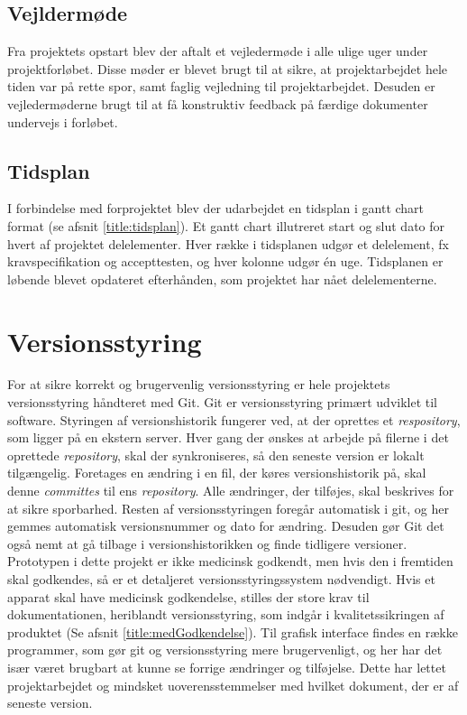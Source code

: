 \subsection{Vejldermøde}
Fra projektets opstart blev der aftalt et vejledermøde i alle ulige uger under projektforløbet. Disse møder er blevet brugt til at sikre, at projektarbejdet hele tiden var på rette spor, samt faglig vejledning til projektarbejdet. Desuden er vejledermøderne brugt til at få konstruktiv feedback på færdige dokumenter undervejs i forløbet. 

\subsection{Tidsplan}
I forbindelse med forprojektet blev der udarbejdet en tidsplan i gantt chart format (se afsnit \ref{title:tidsplan}). Et gantt chart illutreret start og slut dato for hvert af projektet delelementer. Hver række i tidsplanen udgør et delelement, fx kravspecifikation og accepttesten, og hver kolonne udgør én uge. Tidsplanen er løbende blevet opdateret efterhånden, som projektet har nået delelementerne. 

\section{Versionsstyring} \label{title:versionsstyring}
For at sikre korrekt og brugervenlig versionsstyring er hele projektets versionsstyring håndteret med Git. Git er versionsstyring primært udviklet til software. Styringen af versionshistorik fungerer ved, at der oprettes et \textit{respository}, som ligger på en ekstern server. Hver gang der ønskes at arbejde på filerne i det oprettede \textit{repository}, skal der synkroniseres, så den seneste version er lokalt tilgængelig. Foretages en ændring i en fil, der køres versionshistorik på, skal denne \textit{committes} til ens \textit{repository}. Alle ændringer, der tilføjes, skal beskrives for at sikre sporbarhed. Resten af versionsstyringen foregår automatisk i git, og her gemmes automatisk versionsnummer og dato for ændring. Desuden gør Git det også nemt at gå tilbage i versionshistorikken og finde tidligere versioner. 
Prototypen i dette projekt er ikke medicinsk godkendt, men hvis den i fremtiden skal godkendes, så er et detaljeret versionsstyringssystem nødvendigt. Hvis et apparat skal have medicinsk godkendelse, stilles der store krav til dokumentationen, heriblandt versionsstyring, som indgår i kvalitetssikringen af produktet (Se afsnit \ref{title:medGodkendelse}). 
Til grafisk interface findes en række programmer, som gør git og versionsstyring mere brugervenligt, og her har det især været brugbart at kunne se forrige ændringer og tilføjelse. Dette har lettet projektarbejdet og mindsket uoverensstemmelser med hvilket dokument, der er af seneste version. 

